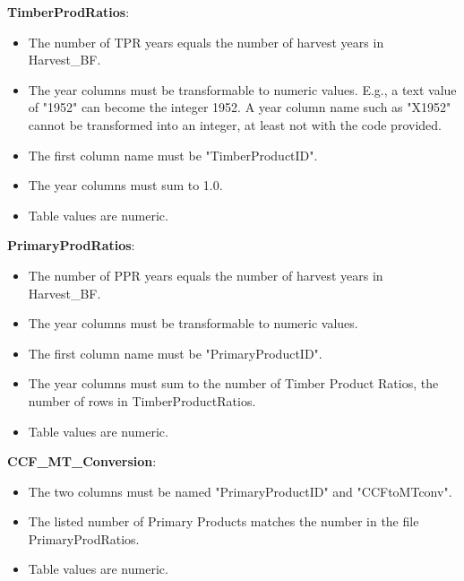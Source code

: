 \documentclass[
  openany]{book}
\providecommand{\tightlist}{%
  \setlength{\itemsep}{0pt}\setlength{\parskip}{0pt}}
\begin{document}
\textbf{TimberProdRatios}:

\begin{itemize}
\tightlist
\item
  The number of TPR years equals the number of harvest years in
  Harvest\_BF.\\
\item
  The year columns must be transformable to numeric values. E.g., a text
  value of "1952" can become the integer 1952. A year column name such
  as "X1952" cannot be transformed into an integer, at least not with
  the code provided.\\
\item
  The first column name must be "TimberProductID".\\
\item
  The year columns must sum to 1.0.\\
\item
  Table values are numeric.
\end{itemize}

\textbf{PrimaryProdRatios}:

\begin{itemize}
\tightlist
\item
  The number of PPR years equals the number of harvest years in
  Harvest\_BF.\\
\item
  The year columns must be transformable to numeric values.\\
\item
  The first column name must be "PrimaryProductID".\\
\item
  The year columns must sum to the number of Timber Product Ratios, the
  number of rows in TimberProductRatios.\\
\item
  Table values are numeric.
\end{itemize}

\textbf{CCF\_MT\_Conversion}:

\begin{itemize}
\tightlist
\item
  The two columns must be named "PrimaryProductID" and "CCFtoMTconv".\\
\item
  The listed number of Primary Products matches the number in the file
  PrimaryProdRatios.\\
\item
  Table values are numeric.
\end{itemize}
\end{document}
